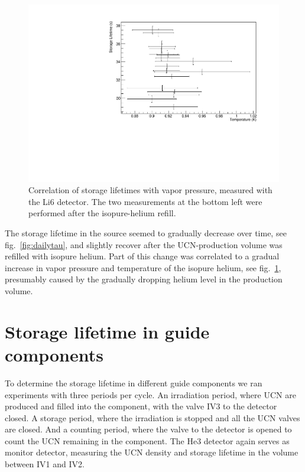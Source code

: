 \documentclass[10pt,letterpaper]{article}
\begin{document}
\begin{figure}
\centering
\includegraphics[width=\textwidth,page=2]{../storagelifetime/tauvstemp.pdf}
\caption{Correlation of storage lifetimes with vapor pressure, measured with the Li6 detector. The two measurements at the bottom left were performed after the isopure-helium refill.}
\label{fig:tauvstemp}
\end{figure}

The storage lifetime in the source seemed to gradually decrease over time, see fig.~\ref{fig:dailytau}, and slightly recover after the UCN-production volume was refilled with isopure helium. Part of this change was correlated to a gradual increase in vapor pressure and temperature of the isopure helium, see fig.~\ref{fig:tauvstemp}, presumably caused by the gradually dropping helium level in the production volume.


\section{Storage lifetime in guide components}

To determine the storage lifetime in different guide components we ran experiments with three periods per cycle. An irradiation period, where UCN are produced and filled into the component, with the valve IV3 to the detector closed. A storage period, where the irradiation is stopped and all the UCN valves are closed. And a counting period, where the valve to the detector is opened to count the UCN remaining in the component. The He3 detector again serves as monitor detector, measuring the UCN density and storage lifetime in the volume between IV1 and IV2.
\end{document}
